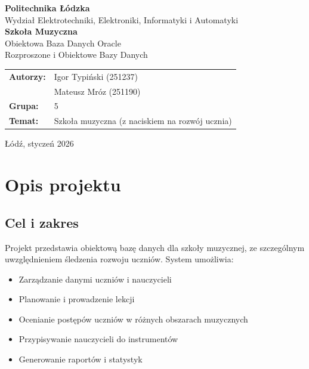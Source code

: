 \documentclass[12pt,a4paper]{article}
\begin{document}
\begin{titlepage}
    \centering
    \vspace*{1cm}

    {\Large\textbf{Politechnika Łódzka}}\\[0.3cm]
    {\large Wydział Elektrotechniki, Elektroniki, Informatyki i Automatyki}\\[2cm]

    {\Huge\textbf{Szkoła Muzyczna}}\\[0.5cm]
    {\Large Obiektowa Baza Danych Oracle}\\[1cm]

    {\large Rozproszone i Obiektowe Bazy Danych}\\[3cm]

    \begin{tabular}{ll}
        \textbf{Autorzy:} & Igor Typiński (251237) \\
                          & Mateusz Mróz (251190) \\[0.5cm]
        \textbf{Grupa:}   & 5 \\[0.5cm]
        \textbf{Temat:}   & Szkoła muzyczna (z naciskiem na rozwój ucznia)
    \end{tabular}

    \vfill
    {\large Łódź, styczeń 2026}
\end{titlepage}

\tableofcontents
\newpage

\section{Opis projektu}

\subsection{Cel i zakres}
Projekt przedstawia obiektową bazę danych dla szkoły muzycznej, ze szczególnym uwzględnieniem śledzenia rozwoju uczniów. System umożliwia:
\begin{itemize}[nosep]
    \item Zarządzanie danymi uczniów i nauczycieli
    \item Planowanie i prowadzenie lekcji
    \item Ocenianie postępów uczniów w różnych obszarach muzycznych
    \item Przypisywanie nauczycieli do instrumentów
    \item Generowanie raportów i statystyk
\end{itemize}
\end{document}
